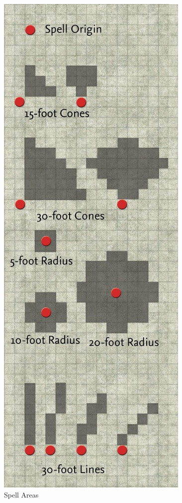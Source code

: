 \begin{figure}
 \sffamily
 \caption{Spell Areas}
 \includegraphics[width=\linewidth]{images/SpellAreas.jpg}
\end{figure}

